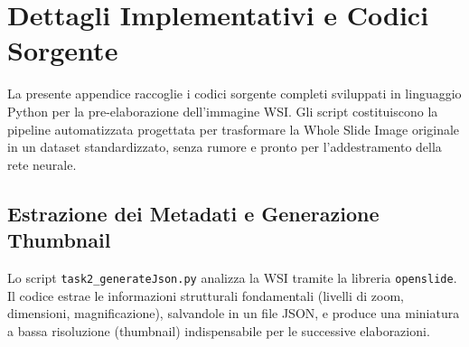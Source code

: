 \lstset{showstringspaces=false}
\chapter{Dettagli Implementativi e Codici Sorgente}
La presente appendice raccoglie i codici sorgente completi sviluppati in linguaggio Python per la pre-elaborazione dell'immagine WSI. Gli script costituiscono la pipeline automatizzata progettata per trasformare la Whole Slide Image originale in un dataset standardizzato, senza  rumore e pronto per l'addestramento della rete neurale.

\section{Estrazione dei Metadati e Generazione Thumbnail}
Lo script \texttt{task2\_generateJson.py} analizza la WSI tramite la libreria \texttt{openslide}. Il codice estrae le informazioni strutturali fondamentali (livelli di zoom, dimensioni, magnificazione), salvandole in un file JSON, e produce una miniatura a bassa risoluzione (thumbnail) indispensabile per le successive elaborazioni.

